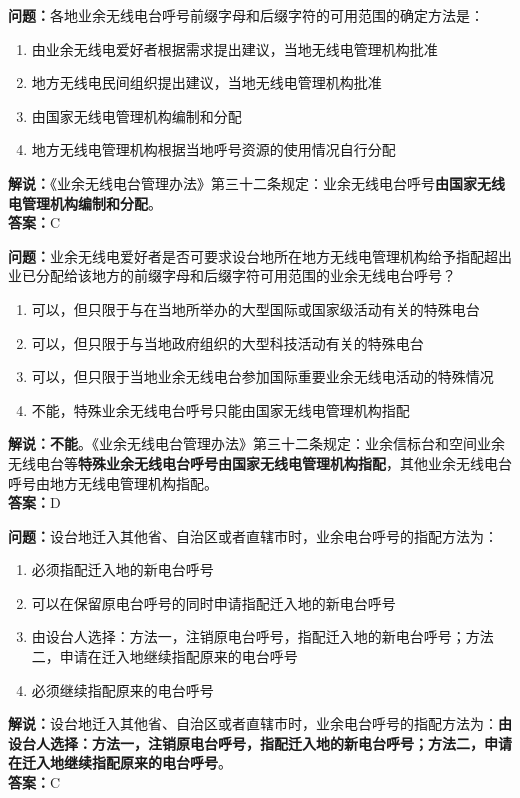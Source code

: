 \bigskip


\noindent\textbf{问题：}各地业余无线电台呼号前缀字母和后缀字符的可用范围的确定方法是：
\begin{enumerate}[label=\Alph*), leftmargin=3em]
	\item 由业余无线电爱好者根据需求提出建议，当地无线电管理机构批准
	\item 地方无线电民间组织提出建议，当地无线电管理机构批准
	\item 由国家无线电管理机构编制和分配
	\item 地方无线电管理机构根据当地呼号资源的使用情况自行分配
\end{enumerate}
\noindent\textbf{解说：}《业余无线电台管理办法》第三十二条规定：业余无线电台呼号\textbf{由国家无线电管理机构编制和分配}。\\\noindent\textbf{答案：}C


\bigskip


\noindent\textbf{问题：}业余无线电爱好者是否可要求设台地所在地方无线电管理机构给予指配超出业已分配给该地方的前缀字母和后缀字符可用范围的业余无线电台呼号？
\begin{enumerate}[label=\Alph*), leftmargin=3em]
	\item 可以，但只限于与在当地所举办的大型国际或国家级活动有关的特殊电台
	\item 可以，但只限于与当地政府组织的大型科技活动有关的特殊电台
	\item 可以，但只限于当地业余无线电台参加国际重要业余无线电活动的特殊情况
	\item 不能，特殊业余无线电台呼号只能由国家无线电管理机构指配
\end{enumerate}
\textbf{解说：不能}。《业余无线电台管理办法》第三十二条规定：业余信标台和空间业余无线电台等\textbf{特殊业余无线电台呼号由国家无线电管理机构指配}，其他业余无线电台呼号由地方无线电管理机构指配。\\\noindent\textbf{答案：}D


\bigskip


\noindent\textbf{问题：}设台地迁入其他省、自治区或者直辖市时，业余电台呼号的指配方法为：
\begin{enumerate}[label=\Alph*), leftmargin=3em]
	\item 必须指配迁入地的新电台呼号
	\item 可以在保留原电台呼号的同时申请指配迁入地的新电台呼号
	\item 由设台人选择：方法一，注销原电台呼号，指配迁入地的新电台呼号；方法二，申请在迁入地继续指配原来的电台呼号
	\item 必须继续指配原来的电台呼号
\end{enumerate}
\noindent\textbf{解说：}设台地迁入其他省、自治区或者直辖市时，业余电台呼号的指配方法为：\textbf{由设台人选择：方法一，注销原电台呼号，指配迁入地的新电台呼号；方法二，申请在迁入地继续指配原来的电台呼号}。\\\noindent\textbf{答案：}C



